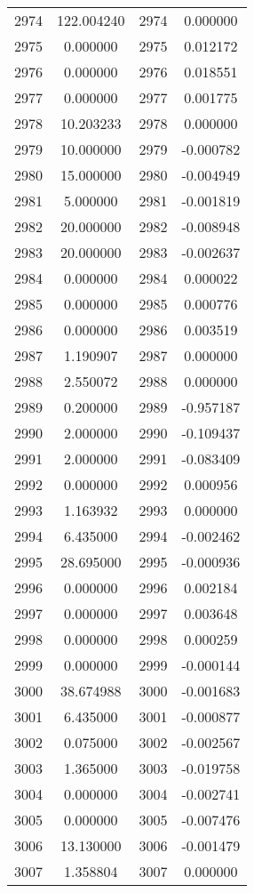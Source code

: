 \documentclass[12pt]{article}
\begin{document}
\begin{longtable}{@{}cccc@{}}
2974 & 122.004240 & 2974 & 0.000000 \\
2975 & 0.000000 & 2975 & 0.012172 \\
2976 & 0.000000 & 2976 & 0.018551 \\
2977 & 0.000000 & 2977 & 0.001775 \\
2978 & 10.203233 & 2978 & 0.000000 \\
2979 & 10.000000 & 2979 & -0.000782 \\
2980 & 15.000000 & 2980 & -0.004949 \\
2981 & 5.000000 & 2981 & -0.001819 \\
2982 & 20.000000 & 2982 & -0.008948 \\
2983 & 20.000000 & 2983 & -0.002637 \\
2984 & 0.000000 & 2984 & 0.000022 \\
2985 & 0.000000 & 2985 & 0.000776 \\
2986 & 0.000000 & 2986 & 0.003519 \\
2987 & 1.190907 & 2987 & 0.000000 \\
2988 & 2.550072 & 2988 & 0.000000 \\
2989 & 0.200000 & 2989 & -0.957187 \\
2990 & 2.000000 & 2990 & -0.109437 \\
2991 & 2.000000 & 2991 & -0.083409 \\
2992 & 0.000000 & 2992 & 0.000956 \\
2993 & 1.163932 & 2993 & 0.000000 \\
2994 & 6.435000 & 2994 & -0.002462 \\
2995 & 28.695000 & 2995 & -0.000936 \\
2996 & 0.000000 & 2996 & 0.002184 \\
2997 & 0.000000 & 2997 & 0.003648 \\
2998 & 0.000000 & 2998 & 0.000259 \\
2999 & 0.000000 & 2999 & -0.000144 \\
3000 & 38.674988 & 3000 & -0.001683 \\
3001 & 6.435000 & 3001 & -0.000877 \\
3002 & 0.075000 & 3002 & -0.002567 \\
3003 & 1.365000 & 3003 & -0.019758 \\
3004 & 0.000000 & 3004 & -0.002741 \\
3005 & 0.000000 & 3005 & -0.007476 \\
3006 & 13.130000 & 3006 & -0.001479 \\
3007 & 1.358804 & 3007 & 0.000000 \\

\end{longtable}
\end{document}
